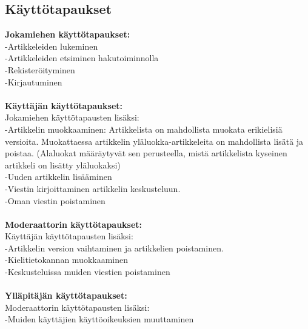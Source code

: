 \documentclass[12pt]{article}
\begin{document}
    \subsection{Käyttötapaukset}
      \textbf{Jokamiehen käyttötapaukset:} \\
        -Artikkeleiden lukeminen \\
        -Artikkeleiden etsiminen hakutoiminnolla \\
        -Rekisteröityminen \\
        -Kirjautuminen \\ \\
      \textbf{Käyttäjän käyttötapaukset:} \\
        Jokamiehen käyttötapausten lisäksi:\\
        -Artikkelin muokkaaminen: Artikkelista on mahdollista muokata erikielisiä versioita. Muokattaessa artikkelin yläluokka-artikkeleita on mahdollista lisätä ja poistaa. (Alaluokat määräytyvät sen perusteella, mistä artikkelista kyseinen artikkeli on lisätty yläluokaksi) \\
        -Uuden artikkelin lisääminen \\
        -Viestin kirjoittaminen artikkelin keskusteluun. \\
        -Oman viestin poistaminen \\ \\
      \textbf{Moderaattorin käyttötapaukset:}\\
        Käyttäjän käyttötapausten lisäksi:\\
        -Artikkelin version vaihtaminen ja artikkelien poistaminen. \\
        -Kielitietokannan muokkaaminen \\
        -Keskusteluissa muiden viestien poistaminen \\ \\
      \textbf{Ylläpitäjän käyttötapaukset:}\\
        Moderaattorin käyttötapausten lisäksi:\\
        -Muiden käyttäjien käyttöoikeuksien muuttaminen \\

  \newpage
\end{document}
